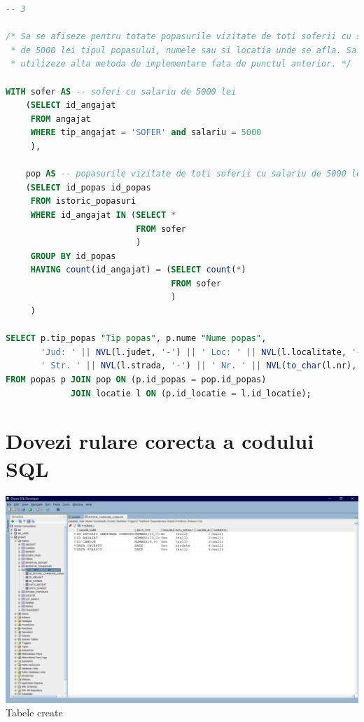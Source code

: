 \documentclass[12pt, a4paper]{article}
\begin{document}
\begin{lstlisting}[language=SQL]
-- 3

/* Sa se afiseze pentru totate popasurile vizitate de toti soferii cu salariul
 * de 5000 lei tipul popasului, numele sau si locatia unde se afla. Sa se
 * utilizeze alta metoda de implementare fata de punctul anterior. */

WITH sofer AS -- soferi cu salariu de 5000 lei
    (SELECT id_angajat
     FROM angajat
     WHERE tip_angajat = 'SOFER' and salariu = 5000
     ),

    pop AS -- popasurile vizitate de toti soferii cu salariu de 5000 lei
    (SELECT id_popas id_popas
     FROM istoric_popasuri
     WHERE id_angajat IN (SELECT *
                          FROM sofer
                          )
     GROUP BY id_popas
     HAVING count(id_angajat) = (SELECT count(*)
                                 FROM sofer
                                 )
     )

SELECT p.tip_popas "Tip popas", p.nume "Nume popas",
       'Jud: ' || NVL(l.judet, '-') || ' Loc: ' || NVL(l.localitate, '-') ||
       ' Str. ' || NVL(l.strada, '-') || ' Nr. ' || NVL(to_char(l.nr), '-') "Locatie popas"
FROM popas p JOIN pop ON (p.id_popas = pop.id_popas)
             JOIN locatie l ON (p.id_locatie = l.id_locatie);
\end{lstlisting}
\newpage

\section{Dovezi rulare corecta a codului SQL}
\includegraphics[width=\textwidth]{tabele.png}
\label{tabele_create}
\centering Tabele create
\end{document}
